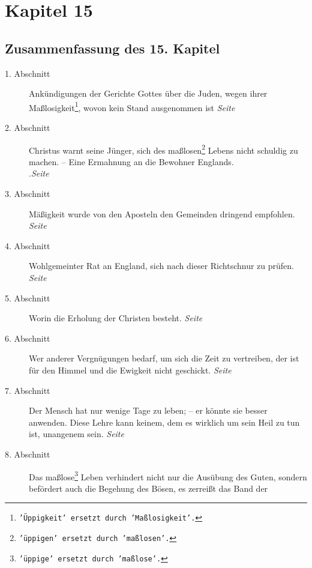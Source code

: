 
\chapter{Kapitel 15} \label{kap15}

\section{Zusammenfassung des 15. Kapitel}

\begin{description}
\item[1. Abschnitt] Ankündigungen der Gerichte Gottes über die Juden, wegen
ihrer Maßlosigkeit\footnote{\texttt{'Üppigkeit' ersetzt durch 'Maßlosigkeit'.}},
wovon
kein Stand ausgenommen ist
\dotfill \textit{Seite~\pageref{kap15_ab1}}\\
\item[2. Abschnitt] Christus warnt seine Jünger, sich des
maßlosen\footnote{\texttt{'üppigen' ersetzt durch 'maßlosen'.}} Lebens nicht
schuldig zu machen. -- Eine Ermahnung an die Bewohner Englands.\\
.\dotfill \textit{Seite~\pageref{kap15_ab2}}\\
\item[3. Abschnitt] Mäßigkeit wurde von den Aposteln den Gemeinden dringend
empfohlen.
\dotfill \textit{Seite~\pageref{kap15_ab3}}\\
\item[4. Abschnitt] Wohlgemeinter Rat an England, sich nach dieser Richtschnur
zu prüfen.
\dotfill \textit{Seite~\pageref{kap15_ab4}}\\
\item[5. Abschnitt] Worin die Erholung der Christen besteht.
\dotfill \textit{Seite~\pageref{kap15_ab5}}\\
\item[6. Abschnitt] Wer anderer Vergnügungen bedarf, um sich die Zeit zu
vertreiben, der ist für den Himmel und die Ewigkeit nicht geschickt.
\dotfill \textit{Seite~\pageref{kap15_ab6}}\\
\item[7. Abschnitt] Der Mensch hat nur wenige Tage zu leben; -- er könnte sie
besser anwenden. Diese Lehre kann keinem, dem es wirklich um sein Heil zu tun
ist, unangenem sein.
\dotfill \textit{Seite~\pageref{kap15_ab6}}\\
\item[8. Abschnitt] Das maßlose\footnote{\texttt{'üppige' ersetzt durch
'maßlose'.}}
Leben verhindert nicht nur die Ausübung des
Guten, sondern befördert auch die Begehung des Bösen, es zerreißt das Band der

\end{description}
